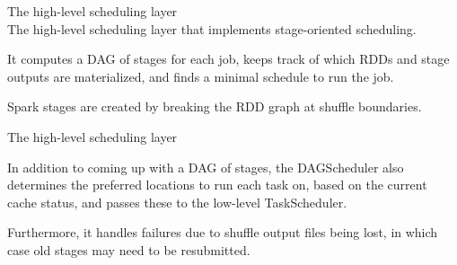 \begin{frame}[plain,t]{The high-level scheduling layer} %
	 \\  \vspace{2ex}
	The high-level scheduling layer that implements stage-oriented scheduling.
	
	\vspace{2ex}
	
	It computes a DAG of stages for each job, keeps track of which RDDs and 
	stage outputs are materialized, and finds a minimal schedule to run the job.
	
	\vspace{2ex}
	
	Spark stages are created by breaking the RDD graph at shuffle boundaries.
	
\end{frame}

\begin{frame}[plain,t]{The high-level scheduling layer} %
	 \\  \vspace{2ex}

  In addition to coming up with a DAG of stages, 
  the DAGScheduler also determines the preferred locations to run each task on, 
  based on the current cache status, and passes these to the low-level TaskScheduler. 
  
  \vspace{2ex}
  
  Furthermore, it handles failures due to shuffle output files being lost, in which case old stages may need to be resubmitted.
	
\end{frame}


